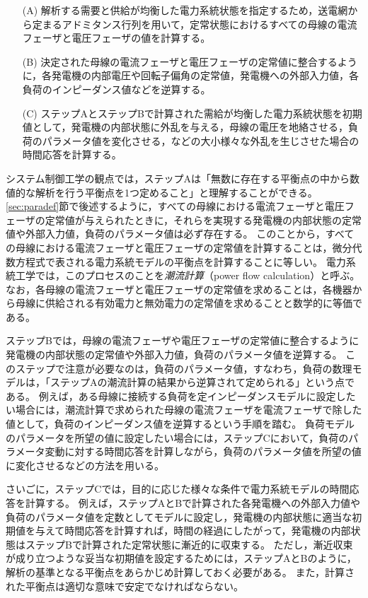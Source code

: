 \documentclass[tombow,dvipdfmx]{corona-a5-1.1}
\begin{document}
\begin{itemize}
\item[(A)] 解析する需要と供給が均衡した電力系統状態を指定するため，送電網から定まるアドミタンス行列を用いて，定常状態におけるすべての母線の電流フェーザと電圧フェーザの値を計算する。
\item[(B)] 決定された母線の電流フェーザと電圧フェーザの定常値に整合するように，各発電機の内部電圧や回転子偏角の定常値，発電機への外部入力値，各負荷のインピーダンス値などを逆算する。
\item[(C)] ステップAとステップBで計算された需給が均衡した電力系統状態を初期値として，発電機の内部状態に外乱を与える，母線の電圧を地絡させる，負荷のパラメータ値を変化させる，などの大小様々な外乱を生じさせた場合の時間応答を計算する。
\end{itemize}

システム制御工学の観点では，ステップAは「無数に存在する平衡点の中から数値的な解析を行う平衡点を1つ定めること」と理解することができる。
\ref{sec:paradef}節で後述するように，すべての母線における電流フェーザと電圧フェーザの定常値が与えられたときに，それらを実現する発電機の内部状態の定常値や外部入力値，負荷のパラメータ値は必ず存在する。
このことから，すべての母線における電流フェーザと電圧フェーザの定常値を計算することは，微分代数方程式で表される電力系統モデルの平衡点を計算することに等しい。
電力系統工学では，このプロセスのことを\emph{潮流計算}（power flow calculation）と呼ぶ。
なお，各母線の電流フェーザと電圧フェーザの定常値を求めることは，各機器から母線に供給される有効電力と無効電力の定常値を求めることと数学的に等価である。

ステップBでは，母線の電流フェーザや電圧フェーザの定常値に整合するように発電機の内部状態の定常値や外部入力値，負荷のパラメータ値を逆算する。
このステップで注意が必要なのは，負荷のパラメータ値，すなわち，負荷の数理モデルは，「ステップAの潮流計算の結果から逆算されて定められる」という点である。
例えば，ある母線に接続する負荷を定インピーダンスモデルに設定したい場合には，潮流計算で求められた母線の電流フェーザを電流フェーザで除した値として，負荷のインピーダンス値を逆算するという手順を踏む。
負荷モデルのパラメータを所望の値に設定したい場合には，ステップCにおいて，負荷のパラメータ変動に対する時間応答を計算しながら，負荷のパラメータ値を所望の値に変化させるなどの方法を用いる。


さいごに，ステップCでは，目的に応じた様々な条件で電力系統モデルの時間応答を計算する。
例えば，ステップAとBで計算された各発電機への外部入力値や負荷のパラメータ値を定数としてモデルに設定し，発電機の内部状態に適当な初期値を与えて時間応答を計算すれば，時間の経過にしたがって，発電機の内部状態はステップBで計算された定常状態に漸近的に収束する。
ただし，漸近収束が成り立つような妥当な初期値を設定するためには，ステップAとBのように，解析の基準となる平衡点をあらかじめ計算しておく必要がある。
また，計算された平衡点は適切な意味で安定でなければならない。
\end{document}
